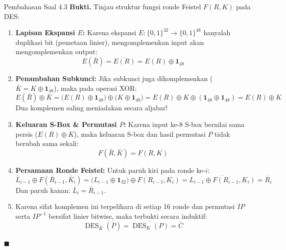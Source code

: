 \documentclass[11pt,a4paper]{article}
\newenvironment{proof}{\noindent\textbf{Bukti.}}{\hfill$\blacksquare$\vspace{0.3em}}
\begin{document}
\begin{solusibox}{Pembahasan Soal 4.3}
\begin{proof}
Tinjau struktur fungsi ronde Feistel $F(R, K)$ pada DES:
\begin{enumerate}[leftmargin=*]
    \item \textbf{Lapisan Ekspansi $E$:} Karena ekspansi $E: \{0, 1\}^{32} \to \{0, 1\}^{48}$ hanyalah duplikasi bit (pemetaan linier), mengomplemenkan input akan mengomplemenkan output:
    \[
    E(\bar{R}) = \overline{E(R)} = E(R) \oplus \mathbf{1}_{48}
    \]
    \item \textbf{Penambahan Subkunci:} Jika subkunci juga dikomplemenkan ($\bar{K} = K \oplus \mathbf{1}_{48}$), maka pada operasi XOR:
    \[
    E(\bar{R}) \oplus \bar{K} = \big(E(R) \oplus \mathbf{1}_{48}\big) \oplus \big(K \oplus \mathbf{1}_{48}\big) = E(R) \oplus K \oplus (\mathbf{1}_{48} \oplus \mathbf{1}_{48}) = E(R) \oplus K
    \]
    Dua komplemen saling meniadakan secara aljabar!
    \item \textbf{Keluaran S-Box \& Permutasi $P$:}
    Karena input ke-8 S-box bernilai sama persis ($E(R) \oplus K$), maka keluaran S-box dan hasil permutasi $P$ tidak berubah sama sekali:
    \[
    F(\bar{R}, \bar{K}) = F(R, K)
    \]
    \item \textbf{Persamaan Ronde Feistel:}
    Untuk paruh kiri pada ronde ke-$i$:
    \[
    \bar{L}_{i-1} \oplus F(\bar{R}_{i-1}, \bar{K}_i) = \big(L_{i-1} \oplus \mathbf{1}_{32}\big) \oplus F(R_{i-1}, K_i) = \overline{L_{i-1} \oplus F(R_{i-1}, K_i)} = \bar{R}_i
    \]
    Dan paruh kanan: $\bar{L}_i = \bar{R}_{i-1}$.
    \item Karena sifat komplemen ini terpelihara di setiap 16 ronde dan permutasi $IP$ serta $IP^{-1}$ bersifat linier bitwise, maka terbukti secara induktif:
    \[
    \operatorname{DES}_{\bar{K}}(\bar{P}) = \overline{\operatorname{DES}_K(P)} = \bar{C}
    \]
\end{enumerate}
\end{proof}


\end{solusibox}
\end{document}
